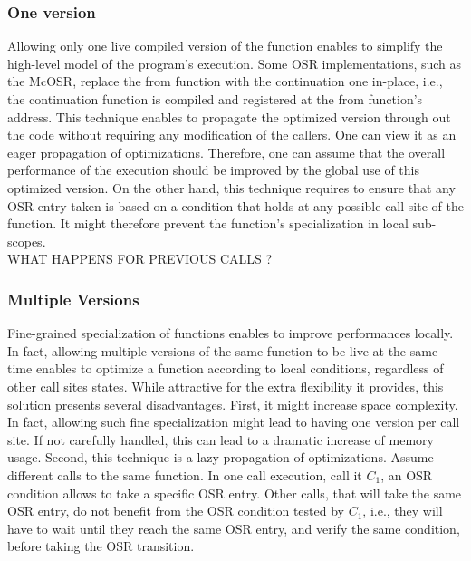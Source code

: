 \subsubsection{One version}
Allowing only one live compiled version of the function enables to simplify the high-level model of the program's execution.
Some OSR implementations, such as the McOSR\cite{lameed2013modular}, replace the from function with the continuation one in-place, i.e., the continuation function is compiled and registered at the from function's address.
This technique enables to propagate the optimized version through out the code without requiring any modification of the callers.
One can view it as an eager propagation of optimizations.
Therefore, one can assume that the overall performance of the execution should be improved by the global use of this optimized version.
On the other hand, this technique requires to ensure that any OSR entry taken is based on a condition that holds at any possible call site of the function.
It might therefore prevent the function's specialization in local sub-scopes.\\ %
WHAT HAPPENS FOR PREVIOUS CALLS ?

\subsubsection{Multiple Versions}
Fine-grained specialization of functions enables to improve performances locally.
In fact, allowing multiple versions of the same function to be live at the same time enables to optimize a function according to local conditions, regardless of other call sites states.
While attractive for the extra flexibility it provides, this solution presents several disadvantages.
First, it might increase space complexity.
In fact, allowing such fine specialization might lead to having one version per call site.
If not carefully handled, this can lead to a dramatic increase of memory usage.
Second, this technique is a lazy propagation of optimizations.
Assume different calls to the same function.
In one call execution, call it $C_1$, an OSR condition allows to take a specific OSR entry.
Other calls, that will take the same OSR entry, do not benefit from the OSR condition tested by $C_1$, i.e., they will have to wait until they reach the same OSR entry, and verify the same condition, before taking the OSR transition.



